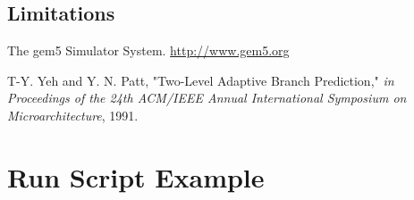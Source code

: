 \documentclass[11pt, a4paper]{article}
\begin{document}
\subsection{Limitations}

\begin{thebibliography}{9}
    The gem5 Simulator System.
    \url{http://www.gem5.org}

    T-Y. Yeh and Y. N. Patt,
    "Two-Level Adaptive Branch Prediction,"
    \textit{in Proceedings of the 24th ACM/IEEE Annual International Symposium on Microarchitecture}, 1991.

\end{thebibliography}

\appendix
\section{Run Script Example}
\end{document}
